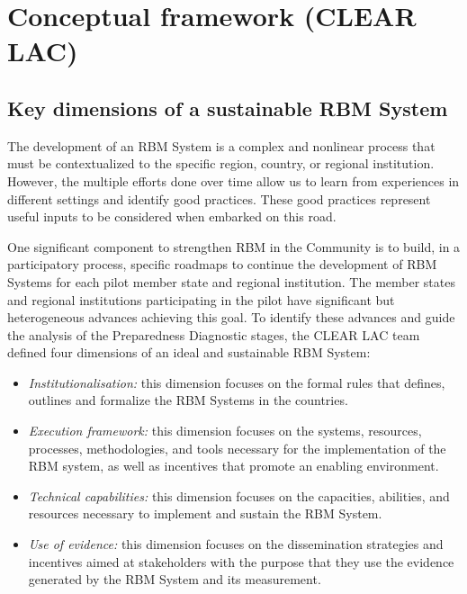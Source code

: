 \documentclass[
  10pt,
]{book}
\begin{document}
\hypertarget{appendix-appendix}{%
\appendix}


\hypertarget{appendixA}{%
\chapter{Conceptual framework (CLEAR LAC)}\label{appendixA}}

\hypertarget{key-dimensions-of-a-sustainable-rbm-system}{%
\section{Key dimensions of a sustainable RBM System}\label{key-dimensions-of-a-sustainable-rbm-system}}

The development of an RBM System is a complex and nonlinear process that must be contextualized to the specific region, country, or regional institution. However, the multiple efforts done over time allow us to learn from experiences in different settings and identify good practices. These good practices represent useful inputs to be considered when embarked on this road.

One significant component to strengthen RBM in the Community is to build, in a participatory process, specific roadmaps to continue the development of RBM Systems for each pilot member state and regional institution. The member states and regional institutions participating in the pilot have significant but heterogeneous advances achieving this goal. To identify these advances and guide the analysis of the Preparedness Diagnostic stages, the CLEAR LAC team defined four dimensions of an ideal and sustainable RBM System:

\begin{itemize}
\item
  \emph{Institutionalisation:} this dimension focuses on the formal rules that defines, outlines and formalize the RBM Systems in the countries.
\item
  \emph{Execution framework:} this dimension focuses on the systems, resources, processes, methodologies, and tools necessary for the implementation of the RBM system, as well as incentives that promote an enabling environment.
\item
  \emph{Technical capabilities:} this dimension focuses on the capacities, abilities, and resources necessary to implement and sustain the RBM System.
\item
  \emph{Use of evidence:} this dimension focuses on the dissemination strategies and incentives aimed at stakeholders with the purpose that they use the evidence generated by the RBM System and its measurement.
\end{itemize}
\end{document}
